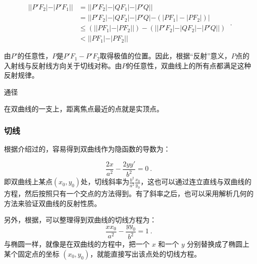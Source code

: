\begin{equation}
\begin{split}
||P'F_2|-|P'F_1|| &=||P'F_2|-|QF_1|-|P'Q||\\
&=||P'F_2|-|QF_2|-|P'Q|-(|PF_1| - |PF_2|)|\\
&\leq(||PF_1| - |PF_2||)- (||P'F_2|-|QF_2|-|P'Q||)\\
&<||PF_1| - |PF_2||
\end{split}~.
\end{equation}

由$P'$的任意性，$P$是$P'F_1-P'F_2$取得极值的位置。因此，根据“反射”意义，$P$点的入射线与反射线方向关于切线对称。由$P$的任意性，双曲线上的所有点都满足这种反射规律。



通径

在双曲线的一支上，距离焦点最近的点就是实顶点。

\subsubsection{切线}

根据介绍过的，容易得到双曲线作为隐函数的导数为：

\begin{equation}
\frac{2x}{a^2} - \frac{2yy'}{b^2} = 0~.
\end{equation}
即双曲线上某点$(x_0,y_0)$处，切线斜率为$\displaystyle\frac{b^2}{a^2}\frac{x_0}{y_0}$，这也可以通过连立直线与双曲线的方程，然后按照只有一个交点的方法得到。有了斜率之后，也可以采用解析几何的方法来验证双曲线的反射性质。

另外，根据，可以整理得到双曲线的切线方程为：
\begin{equation}
\frac{xx_0}{a^2} - \frac{yy_0}{b^2} = 1~.
\end{equation}
与椭圆一样，就像是在双曲线的方程中，把一个 $x$ 和一个 $y$ 分别替换成了椭圆上某个固定点的坐标 $(x_0, y_0)$，就能直接写出该点处的切线方程。

